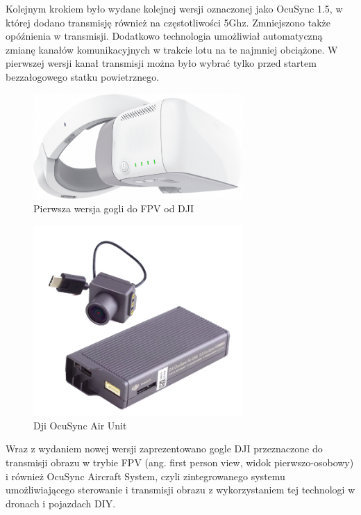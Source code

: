 \hspace{1cm}Kolejnym krokiem było wydane kolejnej wersji oznaczonej jako OcuSync 1.5, w której dodano transmisję również na częstotliwości 5Ghz. Zmniejszono także opóźnienia w transmisji. Dodatkowo technologia umożliwiał automatyczną zmianę kanałów komunikacyjnych w trakcie lotu na te najmniej obciążone. W pierwszej wersji kanał 
transmisji można było wybrać tylko przed startem bezzałogowego statku powietrznego.


\begin{figure}[!ht]
  \centering
  \includegraphics[width=8cm]{./Obrazy/dji-google.png}
  \caption{Pierwsza wersja gogli do FPV od DJI}
  \end{figure}
  

\begin{figure}[!ht]
  \centering
  \includegraphics[width=8cm]{./Obrazy/dji-air-unit.png}
  \caption{Dji OcuSync Air Unit}
  \end{figure}

\hspace{1cm}Wraz z wydaniem nowej wersji zaprezentowano gogle DJI przeznaczone do transmisji obrazu w trybie FPV (ang. first person view, widok pierwszo-osobowy) i również OcuSync Aircraft System, czyli zintegrowanego systemu umożliwiającego sterowanie i transmisji obrazu z wykorzystaniem tej technologi w dronach i pojazdach DIY.

